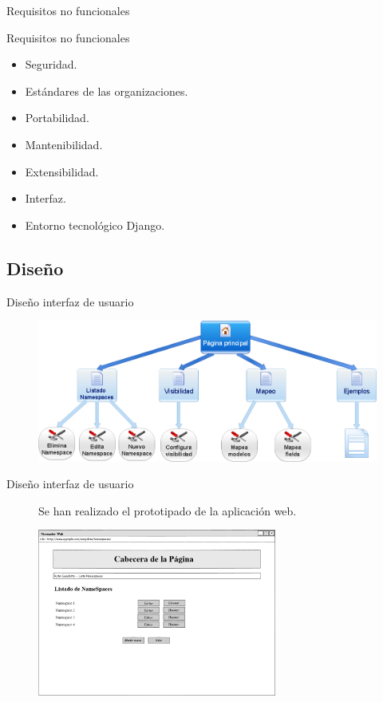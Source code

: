 \documentclass[spanish,xcolor=table,svgnames]{beamer}
\begin{document}
\begin{frame}{Requisitos no funcionales}
  \begin{block}{Requisitos no funcionales}
  \begin{itemize}
    \item Seguridad.
    \item Estándares de las organizaciones.
    \item Portabilidad.
    \item Mantenibilidad.
    \item Extensibilidad.
    \item Interfaz.
    \item Entorno tecnológico Django.
  \end{itemize}
  \end{block}
\end{frame}

\subsection*{Diseño}
\begin{frame}{Diseño interfaz de usuario}
  \begin{figure}[H]
    \begin{center}
      \includegraphics[width=1.0\textwidth]{img/mapa_web.png}
    \end{center}
    \label{fig:mapaweb}
\end{figure}
\end{frame}

\begin{frame}{Diseño interfaz de usuario}
  \begin{figure}[H]
  Se han realizado el prototipado de la aplicación web.
    \begin{center}
        \includegraphics[width=0.7\textwidth]{img/lista_namespaces.png}
    \end{center}
    \label{fig:namespaces}
\end{figure}
\end{frame}
\end{document}
